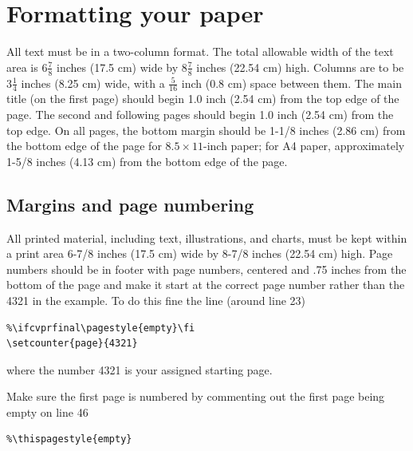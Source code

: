 \documentclass[10pt,twocolumn,letterpaper]{article}
\begin{document}

\section{Formatting your paper}

All text must be in a two-column format. The total allowable width of the
text area is $6\frac78$ inches (17.5 cm) wide by $8\frac78$ inches (22.54
cm) high. Columns are to be $3\frac14$ inches (8.25 cm) wide, with a
$\frac{5}{16}$ inch (0.8 cm) space between them. The main title (on the
first page) should begin 1.0 inch (2.54 cm) from the top edge of the
page. The second and following pages should begin 1.0 inch (2.54 cm) from
the top edge. On all pages, the bottom margin should be 1-1/8 inches (2.86
cm) from the bottom edge of the page for $8.5 \times 11$-inch paper; for A4
paper, approximately 1-5/8 inches (4.13 cm) from the bottom edge of the
page.

\subsection{Margins and page numbering}

All printed material, including text, illustrations, and charts, must be kept
within a print area 6-7/8 inches (17.5 cm) wide by 8-7/8 inches (22.54 cm)
high.
Page numbers should be in footer with page numbers, centered and .75
inches from the bottom of the page and make it start at the correct page
number rather than the 4321 in the example.  To do this fine the line (around
line 23)
\begin{verbatim}
%\ifcvprfinal\pagestyle{empty}\fi
\setcounter{page}{4321}
\end{verbatim}
where the number 4321 is your assigned starting page.

Make sure the first page is numbered by commenting out the first page being
empty on line 46
\begin{verbatim}
%\thispagestyle{empty}
\end{verbatim}
\end{document}

